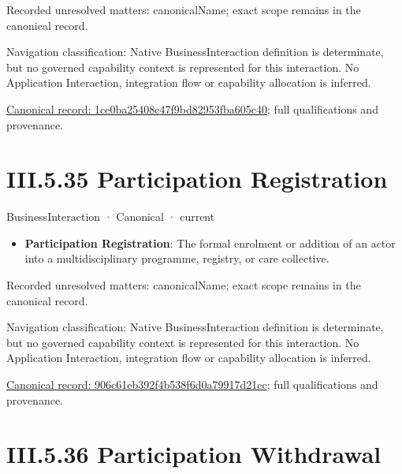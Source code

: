 {\small Recorded unresolved matters: canonicalName; exact scope remains in the canonical record.}\par
{\small Navigation classification: Native BusinessInteraction definition is determinate, but no governed capability context is represented for this interaction. No Application Interaction, integration flow or capability allocation is inferred.}\par
{\footnotesize \href{../../../../continuum/business/business-interaction/1ce0ba25408c47f9bd82953fba605c40.md}{Canonical record: 1ce0ba25408c47f9bd82953fba605c40}; full qualifications and provenance.}\par
\section*{III.5.35 Participation Registration}
\label{navigation:III.5.35}

\label{element:906c61eb392f4b538f6d0a79917d21cc}
{\small BusinessInteraction · Canonical · current}\par

\begin{itemize}


\item \textbf{Participation Registration}: The formal enrolment or addition of an actor into a multidisciplinary programme, registry, or care collective.

\end{itemize}

{\small Recorded unresolved matters: canonicalName; exact scope remains in the canonical record.}\par
{\small Navigation classification: Native BusinessInteraction definition is determinate, but no governed capability context is represented for this interaction. No Application Interaction, integration flow or capability allocation is inferred.}\par
{\footnotesize \href{../../../../continuum/business/business-interaction/906c61eb392f4b538f6d0a79917d21cc.md}{Canonical record: 906c61eb392f4b538f6d0a79917d21cc}; full qualifications and provenance.}\par
\section*{III.5.36 Participation Withdrawal}
\label{navigation:III.5.36}

